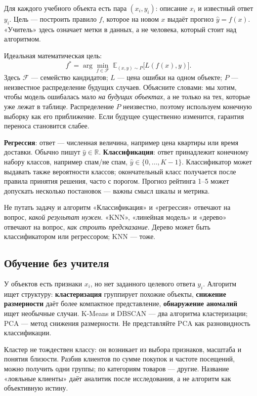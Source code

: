 \documentclass[11pt,a4paper]{article}
\newcommand{\term}[1]{\textbf{\color{navy}#1}}
\begin{document}
Для каждого учебного объекта есть пара $(x_i,y_i)$: описание $x_i$ и известный ответ $y_i$. Цель --- построить правило $f$, которое на новом $x$ выдаёт прогноз $\hat y=f(x)$. «Учитель» здесь означает метки в данных, а не человека, который стоит над алгоритмом.

Идеальная математическая цель:
\[
f^*=\arg\min_{f\in\mathcal F}\;\mathbb E_{(x,y)\sim P}\bigl[L(f(x),y)\bigr].
\]
Здесь $\mathcal F$ --- семейство кандидатов; $L$ --- цена ошибки на одном объекте; $P$ --- неизвестное распределение будущих случаев. Объясните словами: мы хотим, чтобы модель ошибалась мало \emph{на будущих объектах}, а не только на тех, которые уже лежат в таблице. Распределение $P$ неизвестно, поэтому используем конечную выборку как его приближение. Если будущее существенно изменится, гарантия переноса становится слабее.

\term{Регрессия}: ответ --- численная величина, например цена квартиры или время доставки. Обычно пишут $\hat y\in\mathbb R$. \term{Классификация}: ответ принадлежит конечному набору классов, например спам/не спам, $\hat y\in\{0,\ldots,K-1\}$. Классификатор может выдавать также вероятности классов; окончательный класс получается после правила принятия решения, часто с порогом. Прогноз рейтинга 1--5 может допускать несколько постановок --- важны смысл шкалы и метрика.

\begin{warnbox}{Не путать задачу и алгоритм}
«Классификация» и «регрессия» отвечают на вопрос, \emph{какой результат нужен}. «KNN», «линейная модель» и «дерево» отвечают на вопрос, \emph{как строить предсказание}. Дерево может быть классификатором или регрессором; KNN --- тоже.
\end{warnbox}

\subsection{Обучение без учителя}

У объектов есть признаки $x_i$, но нет заданного целевого ответа $y_i$. Алгоритм ищет структуру: \term{кластеризация} группирует похожие объекты, \term{снижение размерности} даёт более компактное представление, \term{обнаружение аномалий} ищет необычные случаи. K-Means и DBSCAN --- два алгоритма кластеризации; PCA --- метод снижения размерности. Не представляйте PCA как разновидность классификации.

Кластер не тождествен классу: он возникает из выбора признаков, масштаба и понятия близости. Разбив клиентов по сумме покупок и частоте посещений, можно получить одни группы; по категориям товаров --- другие. Название «лояльные клиенты» даёт аналитик после исследования, а не алгоритм как объективную истину.
\end{document}
